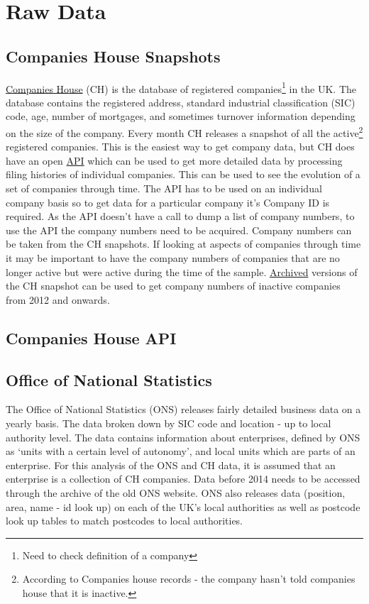 \documentclass[a4paper,10pt]{article}
\begin{document}
\section{Raw Data}
\subsection{Companies House Snapshots}
\href{https://www.gov.uk/government/organisations/companies-house}{Companies House} (CH) is the database of registered companies\footnote{Need to check definition of a company} in the UK. The database contains the registered address, standard industrial classification (SIC) code, age, number of mortgages, and sometimes turnover information depending on the size of the company. Every month CH releases a snapshot of all the active\footnote{According to Companies house records - the company hasn't told companies house that it is inactive.} registered companies. This is the easiest way to get company data, but CH does have an open \href{https://developer.companieshouse.gov.uk/api/docs/}{API} which can be used to get more detailed data by processing filing histories of individual companies. This can be used to see the evolution of a set of companies through time. The API has to be used on an individual company basis so to get data for a particular company it's Company ID is required. As the API doesn't have a call to dump a list of company numbers, to use the API the company numbers need to be acquired. Company numbers can be taken from the CH snapshots. If looking at aspects of companies through time it may be important to have the company numbers of companies that are no longer active but were active during the time of the sample. \href{https://web.archive.org/web/*/http://download.companieshouse.gov.uk/en_output.html}{Archived} versions of the CH snapshot can be used to get company numbers of inactive companies from 2012 and onwards.
\subsection{Companies House API}
\subsection{Office of National Statistics}
The Office of National Statistics (ONS) releases fairly detailed business data on a yearly basis. The data broken down by SIC code and location - up to local authority level. The data contains information about enterprises, defined by ONS as `units with a certain level of autonomy', and local units which are parts of an enterprise. For this analysis of the ONS and CH data, it is assumed that an enterprise is a collection of CH companies. Data before 2014 needs to be accessed through the archive of the old ONS website. ONS also releases data (position, area, name - id look up) on each of the UK's local authorities as well as postcode look up tables to match postcodes to local authorities.
\end{document}
